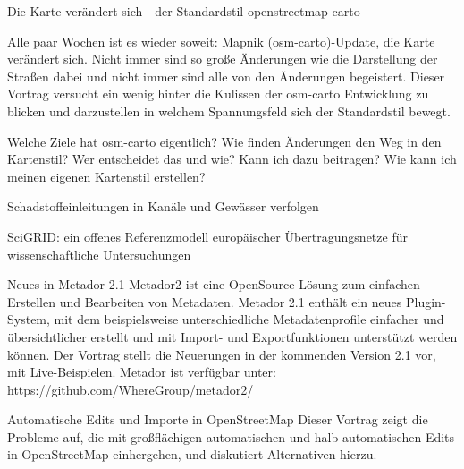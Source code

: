 {%
% 
}

%
{Die Karte verändert sich - der Standardstil openstreetmap-carto}%
{}%
{Alle paar Wochen ist es wieder soweit: Mapnik (osm-carto)-Update, die Karte verändert sich.
Nicht immer sind so große Änderungen wie die Darstellung der Straßen dabei und nicht immer sind
alle von den Änderungen begeistert. Dieser Vortrag versucht ein wenig hinter die Kulissen
der osm-carto Entwicklung zu blicken und darzustellen in welchem Spannungsfeld sich der Standardstil bewegt.

Welche Ziele hat osm-carto eigentlich? Wie finden Änderungen den Weg in den Kartenstil?
Wer entscheidet das und wie? Kann ich dazu beitragen? Wie kann ich meinen eigenen Kartenstil erstellen?}

%
{Schadstoffeinleitungen in Kanäle und Gewässer verfolgen}%
{}%
{}

%
{SciGRID: ein offenes Referenzmodell europäischer Übertragungsnetze für wissenschaftliche Untersuchungen}%
{}%
{}

%
{Neues in Metador 2.1}%
{}%
{Metador2 ist eine OpenSource Lösung zum einfachen Erstellen und Bearbeiten von Metadaten. Metador 2.1 enthält ein neues Plugin-System, mit dem beispielsweise unterschiedliche Metadatenprofile einfacher und übersichtlicher erstellt und mit Import- und Exportfunktionen unterstützt werden können. Der Vortrag stellt die Neuerungen in der kommenden Version 2.1 vor, mit Live-Beispielen. Metador ist verfügbar unter: https://github.com/WhereGroup/metador2/}

%
{Automatische Edits und Importe in OpenStreetMap}%
{}%
{Dieser Vortrag zeigt die Probleme auf, die mit großflächigen automatischen und halb-automatischen Edits in OpenStreetMap einhergehen, und diskutiert Alternativen hierzu. }


